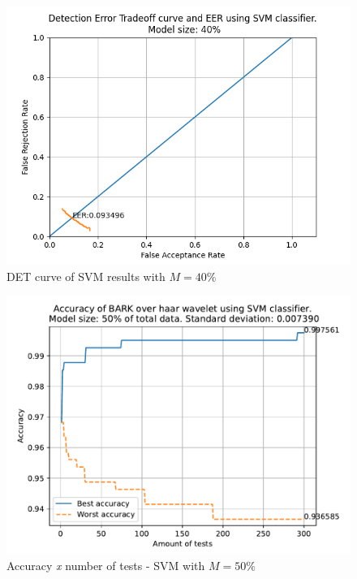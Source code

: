 	\begin{figure}[H]
		\centering
		\includegraphics[scale=.8]{images/results/det/DET_SVM_40}
		\caption{DET curve of SVM results with $M=40\%$}
		\label{fig:detsvm40}
	\end{figure}
	\begin{figure}[H]
		\centering
		\includegraphics[scale=.8]{images/results/confusionMatrices/classifier_SVM_50.pdf}
		\caption{Accuracy \textit{x} number of tests - SVM with $M=50\%$}
		\label{fig:classifiersvm50}
	\end{figure}
